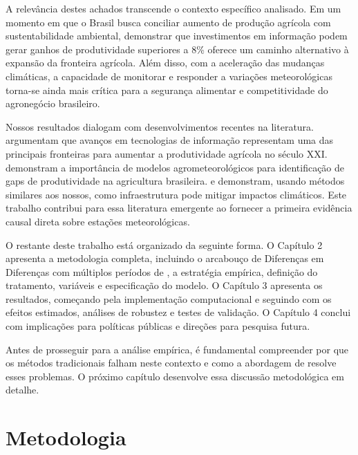\documentclass[
	12pt,				%
	oneside,			%
	a4paper,			%
	english,			%
	french,				%
	spanish,			%
	brazil				%
	]{abntex2}
\begin{document}
A relevância destes achados transcende o contexto específico analisado. Em um momento em que o Brasil busca conciliar aumento de produção agrícola com sustentabilidade ambiental, demonstrar que investimentos em informação podem gerar ganhos de produtividade superiores a 8\% oferece um caminho alternativo à expansão da fronteira agrícola. Além disso, com a aceleração das mudanças climáticas, a capacidade de monitorar e responder a variações meteorológicas torna-se ainda mais crítica para a segurança alimentar e competitividade do agronegócio brasileiro.

Nossos resultados dialogam com desenvolvimentos recentes na literatura.  argumentam que avanços em tecnologias de informação representam uma das principais fronteiras para aumentar a produtividade agrícola no século XXI.  demonstram a importância de modelos agrometeorológicos para identificação de gaps de produtividade na agricultura brasileira.  e  demonstram, usando métodos similares aos nossos, como infraestrutura pode mitigar impactos climáticos. Este trabalho contribui para essa literatura emergente ao fornecer a primeira evidência causal direta sobre estações meteorológicas.

O restante deste trabalho está organizado da seguinte forma. O Capítulo 2 apresenta a metodologia completa, incluindo o arcabouço de Diferenças em Diferenças com múltiplos períodos de , a estratégia empírica, definição do tratamento, variáveis e especificação do modelo. O Capítulo 3 apresenta os resultados, começando pela implementação computacional e seguindo com os efeitos estimados, análises de robustez e testes de validação. O Capítulo 4 conclui com implicações para políticas públicas e direções para pesquisa futura.

Antes de prosseguir para a análise empírica, é fundamental compreender por que os métodos tradicionais falham neste contexto e como a abordagem de  resolve esses problemas. O próximo capítulo desenvolve essa discussão metodológica em detalhe.

\chapter{Metodologia}
\end{document}
